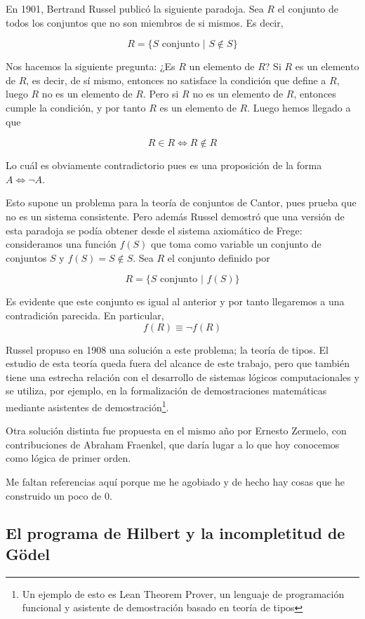 \documentclass{article}
\begin{document}
En 1901, Bertrand Russel publicó la siguiente paradoja. Sea $R$ el conjunto de todos los conjuntos que no son miembros de si mismos. Es decir,

$$
    R = \{S \,\, \text{conjunto} \,\, | \,\, S \notin S\}
$$

Nos hacemos la siguiente pregunta: ¿Es $R$ un elemento de $R$? Si $R$ es un elemento de $R$, es decir, de sí mismo, entonces no satisface la condición que define a $R$, luego $R$ no es un elemento de $R$. Pero si $R$ no es un elemento de $R$, entonces cumple la condición, y por tanto $R$ es un elemento de $R$. Luego hemos llegado a que

$$
    R \in R \iff R \notin R
$$

Lo cuál es obviamente contradictorio pues es una proposición de la forma $A \iff \lnot A$.

Esto supone un problema para la teoría de conjuntos de Cantor, pues prueba que no es un sistema consistente. Pero además Russel demostró que una versión de esta paradoja se podía obtener desde el sistema axiomático de Frege: consideramos una función $f(S)$ que toma como variable un conjunto de conjuntos $S$ y $f(S) = S \notin S$. Sea $R$ el conjunto definido por

$$
    R = \{S \,\, \text{conjunto} \,\, | \,\, f(S)\}
$$

Es evidente que este conjunto es igual al anterior y por tanto llegaremos a una contradición parecida. En particular, $$f(R) \equiv \lnot f(R)$$

Russel propuso en 1908 una solución a este problema; la teoría de tipos. El estudio de esta teoría queda fuera del alcance de este trabajo, pero que también tiene una estrecha relación con el desarrollo de sistemas lógicos computacionales y se utiliza, por ejemplo, en la formalización de demostraciones matemáticas mediante asistentes de demostración\footnote{Un ejemplo de esto es Lean Theorem Prover, un lenguaje de programación funcional y asistente de demostración basado en teoría de tipos}.

Otra solución distinta fue propuesta en el mismo año por Ernesto Zermelo, con contribuciones de Abraham Fraenkel, que daría lugar a lo que hoy conocemos como lógica de primer orden.


Me faltan referencias aquí porque me he agobiado y de hecho hay cosas que he construido un poco de 0.


\subsection{El programa de Hilbert y la incompletitud de Gödel}
\end{document}
